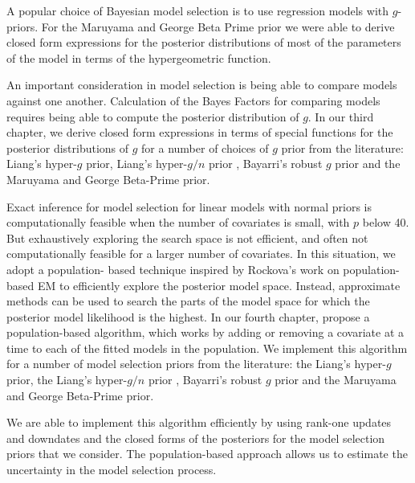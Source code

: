 
A popular choice of Bayesian model selection is to use regression models with $g$-priors. For the Maruyama
and George Beta Prime prior \citep{Maruyama2011} we were able to derive closed form expressions for the
posterior distributions of most of the parameters of the model in terms of the hypergeometric function.



An important consideration in model selection is being able to compare models against one another. Calculation
of the Bayes Factors for comparing models requires being able to compute the posterior distribution of $g$. In
our third chapter, we derive closed form expressions in terms of special functions for the posterior
distributions of $g$ for a number of choices of $g$ prior from the literature: Liang's hyper-$g$ prior,
Liang's hyper-$g/n$ prior \citep{Liang2008}, Bayarri's robust $g$ prior \citep{Bayarri2012} and the  Maruyama
and George Beta-Prime \citep{Maruyama2011} prior.

Exact inference for model selection for linear models with normal priors is computationally feasible when the
number of  covariates is small, with $p$ below 40. But exhaustively exploring the search space is not
efficient, and often not computationally feasible for a larger number of covariates. In this situation, we
adopt a population- based technique inspired by Rockova's work on population-based EM to efficiently explore
the posterior model space. Instead, approximate methods can be used to search the parts of the model space for
which the posterior model likelihood is the highest. In our fourth chapter, propose a population-based
algorithm, which works by adding or removing a covariate at a time to each of the fitted models in the
population. We implement this algorithm for a number of model selection priors from the literature: the
Liang's hyper-$g$ prior, the Liang's hyper-$g/n$ prior \citep{Liang2008}, Bayarri's robust $g$ prior
\citep{Bayarri2012} and the  Maruyama and George Beta-Prime \citep{Maruyama2011} prior.

We are able to implement this algorithm efficiently by using rank-one updates and downdates and the closed
forms of the posteriors for the model selection priors that we consider. The population-based approach allows
us to estimate the uncertainty in the model selection process.

